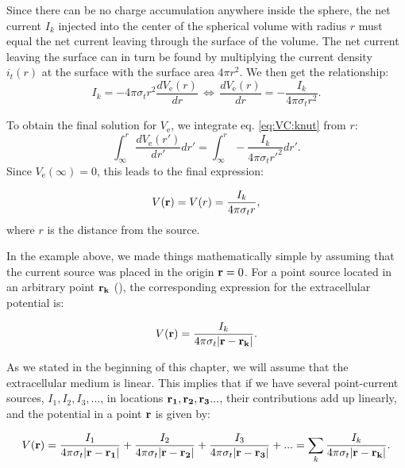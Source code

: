 Since there can be no charge accumulation anywhere inside the sphere, 
the net current $I_k$ injected into the center of the spherical volume with radius $r$ 
must equal the net current leaving through the surface of the volume. 
The net current leaving the surface can in turn be found by multiplying 
the current density $i_t(r)$ at the surface with the surface area $4\pi r^2$. 
We then get the relationship:
\begin{equation}
I_k = -4\pi \sigma_t r^2  \frac{dV_\mathrm{e}(r)}{dr} \, \iff \, \frac{dV_\mathrm{e}(r)}{dr} = -\frac{I_k}{4\pi \sigma_t r^2 }.
\label{eq:VC:knut}
\end{equation}


To obtain the final solution for $V_\mathrm{e}$, we integrate eq. \ref{eq:VC:knut} from $r$:
\begin{equation}
\int_{\infty}^r \frac{dV_\mathrm{e}(r')}{dr'} dr' = \int_{\infty}^r -\frac{I_k}{4\pi \sigma_t r'^2 } dr'.
\label{eq:VC:knut2}
\end{equation}
Since $V_\mathrm{e}({\infty}) = 0$, this leads to the final expression:

\begin{equation}
V({\bf r}) = V(r) = \frac{I_k}{4\pi \sigma_t r},
\label{eq:VC:pointsource}
\end{equation}
where $r$ is the distance from the source.

In the example above, we made things mathematically simple by assuming 
that the current source was placed in the origin ${\bf r} = 0$. 
For a point source located in an arbitrary point ${\bf r_k} $ (), 
the corresponding expression for the extracellular potential is:

\begin{equation}
V({\bf r}) = \frac{I_k}{4\pi \sigma_t |{\bf r-r_k}|}.
\label{eq:VC:pointsource2}
\end{equation}

As we stated in the beginning of this chapter, we will assume that the extracellular medium is linear.
This implies that if we have several point-current sources, $I_{1}, I_2, I_3, ... $, 
in locations ${\bf r_1}, {\bf r_2}, {\bf r_3} ... $, 
their contributions add up linearly, and the potential in a point ${\bf r}$ is given by:

\begin{equation}
V({\bf r}) = \frac{I_1}{4\pi  \sigma_t {\bf |r-r_1|}} + \frac{I_2}{4\pi  \sigma_t {\bf |r-r_2|} } + \frac{I_3}{4\pi  \sigma_t {\bf |r-r_3|} } + ... = \sum_k \frac{I_k}{4\pi  \sigma_t {\bf |r-r_k|} }.
\label{eq:VC:pointsources}
\end{equation}


